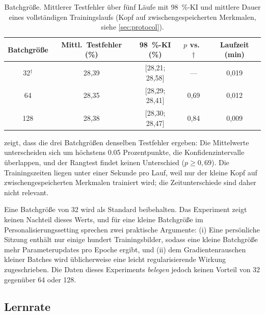 \documentclass[
  11pt,
  a4paper,
  oneside,
  DIV=12,
  BCOR=8mm,
  parskip=half,
  headings=normal,
  bibliography=totoc,
  listof=totoc
]{scrreprt}
\newcommand{\sel}{\ensuremath{^{\dagger}}}
\begin{document}
\begin{table}[htbp]
  \centering
  \caption{Batchgröße. Mittlerer Testfehler über fünf Läufe mit
           \SI{98}{\percent}-KI und mittlere Dauer eines vollständigen
           Trainingslaufs (Kopf auf zwischengespeicherten Merkmalen, siehe
           \cref{sec:protocol}).}
  \label{tab:batch_size}
  \small
  \begin{tabular}{ccccc}
    \toprule
    Batchgröße & Mittl.\ Testfehler (\%) & \SI{98}{\percent}-KI (\%) & $p$ vs.\ $\dagger$ & Laufzeit (min) \\
    \midrule
    32\sel{}     & 28,39 & [28,21; 28,58] & ---  & 0,019 \\
    64           & 28,35 & [28,29; 28,41] & 0,69 & 0,012 \\
    128          & 28,38 & [28,30; 28,47] & 0,84 & 0,009 \\
    \bottomrule
  \end{tabular}
\end{table}

 zeigt, dass die drei Batchgrößen denselben Testfehler
ergeben: Die Mittelwerte unterscheiden sich um höchstens \num{0,05}
Prozentpunkte, die Konfidenzintervalle überlappen, und der Rangtest findet
keinen Unterschied ($p\ge0,69$). Die Trainingszeiten liegen unter einer
Sekunde pro Lauf, weil nur der kleine Kopf auf zwischengespeicherten Merkmalen
trainiert wird; die Zeitunterschiede sind daher nicht relevant.

Eine Batchgröße von 32 wird als Standard beibehalten. Das Experiment zeigt
keinen Nachteil dieses Werts, und für eine kleine Batchgröße im
Personalisierungssetting sprechen zwei praktische Argumente: (i) Eine
persönliche Sitzung enthält nur einige hundert Trainingsbilder, sodass eine
kleine Batchgröße mehr Parameterupdates pro Epoche ergibt, und (ii) dem
Gradientenrauschen kleiner Batches wird üblicherweise eine leicht
regularisierende Wirkung zugeschrieben. Die Daten dieses Experiments
\emph{belegen} jedoch keinen Vorteil von 32 gegenüber 64 oder 128.

\subsection{Lernrate}
\label{sec:lr}
\end{document}
